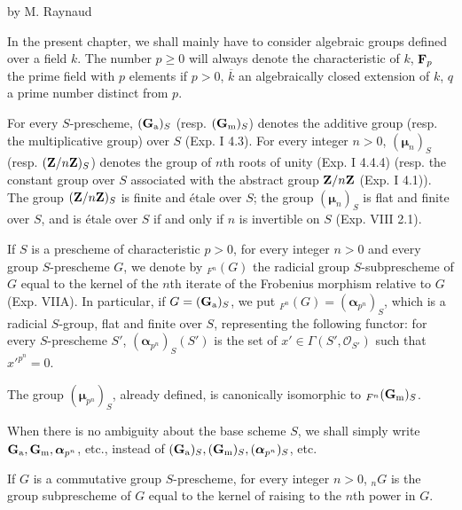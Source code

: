 \label{XVII}
\begin{center}by M. Raynaud{\renewcommand{\thefootnote}{*}\footnotemark}\end{center}
{\renewcommand{\thefootnote}{*}}
{\renewcommand{\thefootnote}{(0)}}
\setcounter{footnote}{0}

In the present chapter, we shall mainly have to consider algebraic groups defined over a field $k$. The number $p\geq0$ will always denote the characteristic of $k$, $\mathbf{F}_p$ the prime field with $p$ elements if $p>0$, $\overline k$ an algebraically closed extension of $k$, $q$ a prime number distinct from $p$.

For every $S$-prescheme, $(\mathbf{G}_{\mathrm{a}})_S$ (resp. $(\mathbf{G}_{\mathrm{m}})_S$) denotes the additive group (resp. the multiplicative group) over $S$ (\cf Exp. I 4.3). For every integer $n>0$, $(\boldsymbol\mu_n)_S$ (resp. $(\mathbf{Z}/n\mathbf{Z})_S$) denotes the group of $n$th roots of unity (Exp. I 4.4.4) (resp. the constant group over $S$ associated with the abstract group $\mathbf{Z}/n\mathbf{Z}$ (Exp. I 4.1)). The group $(\mathbf{Z}/n\mathbf{Z})_S$ is finite and étale over $S$; the group $(\boldsymbol\mu_n)_S$ is flat and finite over $S$, and is étale over $S$ if and only if $n$ is invertible on $S$ (Exp. VIII 2.1).

If $S$ is a prescheme of characteristic $p>0$, for every integer $n>0$ and every group $S$-prescheme $G$, we denote by ${}_{F^n}(G)$ the radicial group $S$-subprescheme of $G$ equal to the kernel of the $n$th iterate of the Frobenius morphism relative to $G$ (Exp. VIIA). In particular, if $G=(\mathbf{G}_{\mathrm{a}})_S$, we put ${}_{F^n}(G)=(\boldsymbol\alpha_{p^n})_S$, which is a radicial $S$-group, flat and finite over $S$, representing the following functor: for every $S$-prescheme $S'$, $(\boldsymbol\alpha_{p^n})_S(S')$ is the set of $x'\in\Gamma(S',\mathcal O_{S'})$ such that $x'^{p^n}=0$.

The group $(\boldsymbol\mu_{p^n})_S$, already defined, is canonically isomorphic to ${}_{F^n}(\mathbf{G}_{\mathrm{m}})_S$.

When there is no ambiguity about the base scheme $S$, we shall simply write $\mathbf{G}_{\mathrm{a}},\mathbf{G}_{\mathrm{m}},\boldsymbol\alpha_{p^n}$, etc., instead of $(\mathbf{G}_{\mathrm{a}})_S,(\mathbf{G}_{\mathrm{m}})_S,(\boldsymbol\alpha_{p^n})_S$, etc.

If $G$ is a commutative group $S$-prescheme, for every integer $n>0$, ${}_nG$ is the group subprescheme of $G$ equal to the kernel of raising to the $n$th power in $G$.

